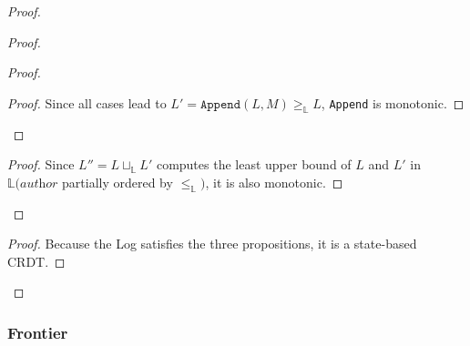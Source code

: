 \documentclass[9pt, oneside]{article}   	%
\begin{document}
\begin{proof}
\begin{proof}
\begin{proof}
			\qedstep{}
			\begin{proof}
				Since all cases lead to $L' = \texttt{Append}(L, M) \geq_\mathds{L} L$, \texttt{Append} is monotonic.
			\end{proof}
		\end{proof}
		
		\begin{proof}
			Since $L'' = L \sqcup_\mathds{L} L'$ computes the least upper bound of $L$ and $L'$ in $\mathds{L}(\textit{author}$ partially ordered by $\leq_\mathds{L})$, it is also monotonic.
		\end{proof}
	\end{proof}
	
	\qedstep{}
	\begin{proof}
		Because the Log satisfies the three propositions, it is a state-based CRDT.
	\end{proof}
\end{proof}

\subsubsection{Frontier}
\label{sec:proofs:convergence:frontier}
\end{document}
